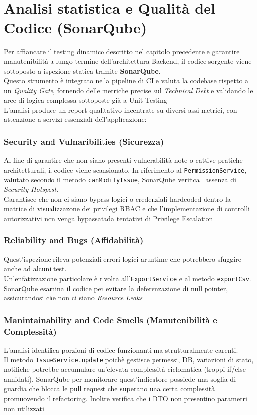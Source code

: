 \newpage
\chapter{Analisi statistica e Qualità del Codice (SonarQube)}
Per affiancare il testing dinamico descritto nel capitolo precedente e garantire manutenibilità a lungo termine dell'architettura Backend, il codice sorgente viene sottoposto a ispezione statica tramite \textbf{SonarQube}. \\
Questo strumento è integrato nella pipeline di CI e valuta la codebase rispetto a un \textit{Quality Gate}, fornendo delle metriche precise sul \textit{Technical Debt} e validando le aree di logica complessa sottoposte già a Unit Testing\\
L'analisi produce un report qualitativo incentrato su diversi assi metrici, con attenzione a servizi essenziali dell'applicazione:

\subsection{Security and Vulnaribilities (Sicurezza)}
Al fine di garantire che non siano presenti vulnerabilità note o cattive pratiche architetturali, il codice viene scansionato. In riferimento al \texttt{PermissionService}, valutato secondo il metodo \texttt{canModifyIssue}, SonarQube verifica l'assenza di \textit{Security Hotspost}.\\
Garantisce che non ci siano bypass logici o credenziali hardcoded dentro la matrice di visualizzazone dei privilegi RBAC e che l'implementazione di controlli autorizzativi non venga bypassatada tentativi di Privilege Escalation

\subsection{Reliability and Bugs (Affidabilità)}
Quest'ispezione rileva potenziali errori logici aruntime che potrebbero sfuggire anche ad alcuni test.\\
Un'enfatizzazione particolare è rivolta all'\texttt{ExportService} e al metodo \texttt{exportCsv}. SonarQube esamina il codice per evitare la deferenzazione di null pointer, assicurandosi che non ci siano \textit{Resource Leaks}

\subsection{Manintainability and Code Smells (Manutenibilità e Complessità)}
L'analisi identifica porzioni di codice funzionanti ma strutturalmente carenti.\\
Il metodo \texttt{IssueService.update} poichè gestisce permessi, DB, variazioni di stato, notifiche potrebbe accumulare un'elevata complessità ciclomatica (troppi if/else annidati). SonarQube per monitorare quest'indicatore possiede una soglia di guardia che blocca le pull request che superano una certa complessità promuovendo il refactoring. Inoltre verifica che i DTO non presentino parametri non utilizzati

